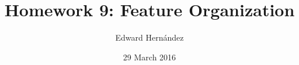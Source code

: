 \documentclass[doc,12pt]{apa6}
\begin{document}
\title{Homework 9: Feature Organization}
\author{Edward Hern\'{a}ndez}
\date{29 March 2016}
\maketitle
\end{document}
